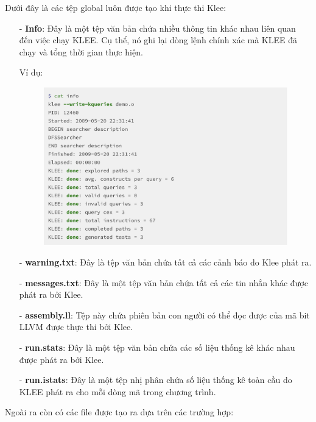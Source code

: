 \documentclass[12pt,a4paper]{article}
\begin{document}
Dưới đây là các tệp global luôn được tạo khi thực thi Klee:

\begin{itemize}
\item[-] \textbf{Info}: Đây là một tệp văn bản chứa nhiều thông tin khác nhau liên quan đến việc chạy KLEE. Cụ thể, nó ghi lại dòng lệnh chính xác mà KLEE đã chạy và tổng thời gian thực hiện. 

\newpage Ví dụ:

\begin{figure}[ht]
\begin{center}
\includegraphics[scale=.3]{hinhanh/fileinfo.png}
\end{center}
\end{figure}

\item[-] \textbf{warning.txt}: Đây là tệp văn bản chứa tất cả các cảnh báo do Klee phát ra.
\item[-] \textbf{messages.txt}: Đây là một tệp văn bản chứa tất cả các tin nhắn khác được phát ra bởi Klee.
\item[-] \textbf{assembly.ll}: Tệp này chứa phiên bản con người có thể đọc được của mã bit LLVM được thực thi bởi Klee. 
\item[-] \textbf{run.stats}: Đây là một tệp văn bản chứa các số liệu thống kê khác nhau được phát ra bởi Klee.
\item[-] \textbf{run.istats}: Đây là một tệp nhị phân chứa số liệu thống kê toàn cầu do KLEE phát ra cho mỗi dòng mã trong chương trình.
\end{itemize}

Ngoài ra còn có các file được tạo ra dựa trên các trường hợp:
\end{document}
